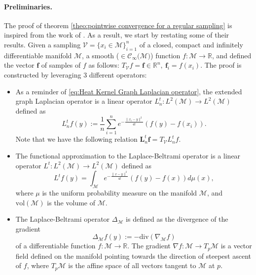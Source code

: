 \documentclass{article} %
\renewcommand{\b}[1]{{\bm{#1}}}  %
\newcommand{\R}{\mathbb{R}}
\newcommand{\V}{\mathcal{V}}  %
\begin{document}
\paragraph{Preliminaries.}
The proof of theorem \ref{theo:pointwise convergence for a regular sampling} is inspired from the work of \citet{belkin2005towards}. As a result, we start by restating some of their results.
Given a sampling $\V = \{x_i\in\mathcal M\}_{i=1}^n$ of a closed, compact and infinitely differentiable manifold $\mathcal{M}$, a smooth ($\in\mathcal{C}_\infty(\mathcal{M)}$) function  $f:\mathcal{M} \rightarrow \mathbb{R}$, and defined the vector $\b{f}$ of samples of $f$ as follows: $T_\V f = \b{f} \in \mathbb{R}^n,\ \b{f}_i = f(x_i)$.
The proof is constructed by leveraging 3 different operators:
\begin{itemize}
  \item As a reminder of \eqref{eq:Heat Kernel Graph Laplacian operator}, the extended graph Laplacian operator is a linear operator $L_n^t: L^{2}(\mathcal{M}) \rightarrow L^{2}(\mathcal{M})$ defined as
	\begin{equation}
	 L_n^t f(y) := \frac{1}{n}\sum_{i=1}^{n} e^{ -\frac{\|x_i-y\|^2}{4t}} \left(f(y)-f(x_i)\right).
	\end{equation}
	Note that we have the following relation $\b{L}_n^t \b{f} = T_\V L_n^t f$.
	\item The functional approximation to the Laplace-Beltrami operator is a linear operator $L^t: L^{2}(\mathcal{M}) \rightarrow L^{2}(\mathcal{M})$ defined  as
	\begin{equation}
    \label{eq:Functional approximation to the Laplace-Beltrami operator}
	L^tf(y) = \int_{\mathcal{M}} e^{-\frac{\|x-y\|^2}{4t}}\left(f(y)-f(x)\right)d\mu(x),
	\end{equation}
	where $\mu$ is the uniform probability measure on the manifold $\mathcal{M}$, and $\text{vol}(\mathcal{M})$ is the volume of $\mathcal{M}$.
	\item
	The Laplace-Beltrami operator $\Delta_{\mathcal{M}}$ is defined as the divergence of the gradient
	\begin{equation}
        \label{eq:laplace-beltrami}
        \Delta_{\mathcal M}f(y) := -\text{div}(\nabla_{\mathcal M}f)
    \end{equation}
    of a differentiable function $f: \mathcal M\rightarrow \R$. The gradient $\nabla f: \mathcal M \rightarrow T_p\mathcal M$ is a vector field defined on the manifold pointing towards the direction of steepest ascent of $f$, where $T_p\mathcal M$ is the affine space of all vectors tangent to $\mathcal M$ at $p$.

\end{itemize}
\end{document}

